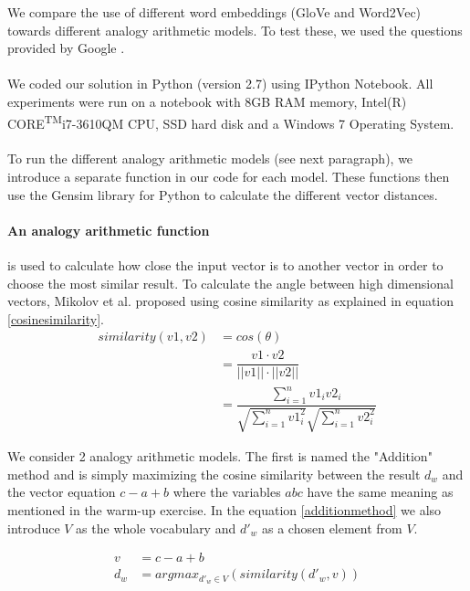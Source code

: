 We compare the use of different word embeddings (GloVe and Word2Vec) towards different analogy arithmetic models\cite{marekreiblog}. To test these, we used the questions provided by Google \cite{word2vecquestionwords}.
\paragraph{}
We coded our solution in Python (version 2.7) using IPython Notebook. All experiments were run on a notebook with 8GB RAM memory, Intel(R) CORE\textsuperscript{TM}i7-3610QM CPU, SSD hard disk and a Windows 7 Operating System.
\paragraph{}
To run the different analogy arithmetic models (see next paragraph), we introduce a separate function in our code for each model. These functions then use the Gensim library for Python \cite{gensim} to calculate the different vector distances.
\paragraph{An analogy arithmetic function} 
is used to calculate how close the input vector is to another vector in order to choose the most similar result. To calculate the angle between high dimensional vectors, Mikolov et al. \cite{mikolov} proposed using cosine similarity as explained in equation \ref{cosinesimilarity}. 
\begin{equation}
\begin{split}
\label{cosinesimilarity}
similarity(v1, v2) &= cos(\theta) \\&= \dfrac{v1 \cdot v2}{||v1|| \cdot ||v2||}  \\&= \dfrac{\sum_{i=1}^{n}v1_i v2_i}{\sqrt{\sum_{i=1}^{n}v1_i^2} \sqrt{\sum_{i=1}^{n} v2_i^2}}
\end{split}
\end{equation}

We consider 2 analogy arithmetic models. The first is named the "Addition" method and is simply maximizing the cosine similarity between the result $d_w$ and the vector equation $c-a+b$ where the variables $a b c$ have the same meaning as mentioned in the warm-up exercise. In the equation \ref{additionmethod} we also introduce $V$ as the whole vocabulary and $d'_w$ as a chosen element from $V$.

\begin{equation}
\begin{split}
\label{additionmethod}
v &= c-a+b\\
d_w &= argmax_{d'_w \in V}(similarity(d'_w, v) )
\end{split}
\end{equation}

